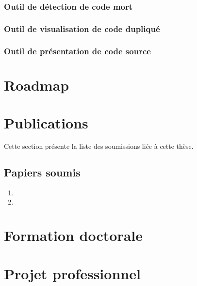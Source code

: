 \documentclass[a4paper]{article}
\begin{document}
\subsubsection{Outil de détection de code mort}

\subsubsection{Outil de visualisation de code dupliqué}

\subsubsection{Outil de présentation de code source}

\section{Roadmap}
\label{sec:roadmap}

\section{Publications}

Cette section présente la liste des  soumissions liée à cette thèse.


\subsection{Papiers soumis}

\begin{enumerate}
  \item 
  \item 
\end{enumerate}

\section{Formation doctorale}


\section{Projet professionnel}



\footnotesize{
  
  
}
\end{document}
